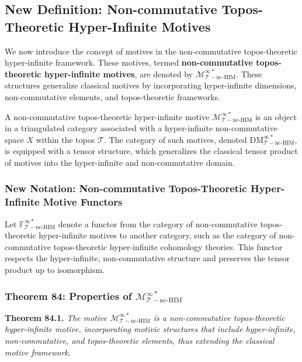 \documentclass{article}
\begin{document}
\subsection{New Definition: Non-commutative Topos-Theoretic Hyper-Infinite Motives}
We now introduce the concept of motives in the non-commutative topos-theoretic hyper-infinite framework. These motives, termed \textbf{non-commutative topos-theoretic hyper-infinite motives}, are denoted by \(\mathcal{M}_{\mathcal{T}-\text{nc-HIM}}^{\infty *}\). These structures generalize classical motives by incorporating hyper-infinite dimensions, non-commutative elements, and topos-theoretic frameworks.

A non-commutative topos-theoretic hyper-infinite motive \(\mathcal{M}_{\mathcal{T}-\text{nc-HIM}}^{\infty *}\) is an object in a triangulated category associated with a hyper-infinite non-commutative space \(X\) within the topos \(\mathcal{T}\). The category of such motives, denoted \(\text{DM}_{\mathcal{T}-\text{nc-HIM}}^{\infty *}\), is equipped with a tensor structure, which generalizes the classical tensor product of motives into the hyper-infinite and non-commutative domain.

\subsubsection{New Notation: Non-commutative Topos-Theoretic Hyper-Infinite Motive Functors}
Let \(\mathbb{F}_{\mathcal{T}-\text{nc-HIM}}^{\infty *}\) denote a functor from the category of non-commutative topos-theoretic hyper-infinite motives to another category, such as the category of non-commutative topos-theoretic hyper-infinite cohomology theories. This functor respects the hyper-infinite, non-commutative structure and preserves the tensor product up to isomorphism.

\subsubsection{Theorem 84: Properties of \(\mathcal{M}_{\mathcal{T}-\text{nc-HIM}}^{\infty *}\)}
\textbf{Theorem 84.1.} \textit{The motive \(\mathcal{M}_{\mathcal{T}-\text{nc-HIM}}^{\infty *}\) is a non-commutative topos-theoretic hyper-infinite motive, incorporating motivic structures that include hyper-infinite, non-commutative, and topos-theoretic elements, thus extending the classical motive framework.}
\end{document}
